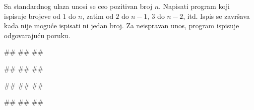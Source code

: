 \begin{Exercise}[difficulty=1, label=p1.7_] 
Sa standardnog ulaza unosi se ceo pozitivan broj $n$. Napisati program
koji ispisuje brojeve od $1$ do $n$, zatim od $2$ do $n-1$, $3$ do
$n-2$, itd. Ispis se završava kada nije moguće ispisati ni jedan
broj. Za neispravan unos, program ispisuje odgovarajuću  poruku.

\begin{miditest}
\begin{upotreba}{1}
#\naslovInt#
##
##
\end{upotreba}
\end{miditest}
\begin{miditest}
\begin{upotreba}{2}
#\naslovInt#
##
##
\end{upotreba}
\end{miditest}

\begin{miditest}
\begin{upotreba}{3}
#\naslovInt#
##
##
\end{upotreba}
\end{miditest}
\begin{miditest}
\begin{upotreba}{4}
#\naslovInt#
##
##
\end{upotreba}
\end{miditest}
\end{Exercise}
\begin{Answer}[ref=p1.7_]
\end{Answer}


